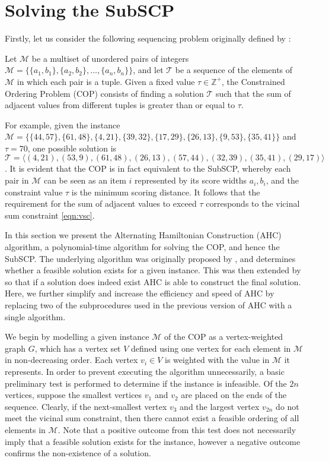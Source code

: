 \documentclass[authoryear]{elsarticle}
\begin{document}
\section{Solving the SubSCP}
\label{sec:ahc}
\noindent Firstly, let us consider the following sequencing problem originally defined by \citet{hawa2018}:

\begin{definition} %
	\label{defn:cop}
	Let $\mathcal{M}$ be a multiset of unordered pairs of integers $\mathcal{M} = \{\{a_1, b_1\}, \{a_2, b_2\},\dotsc,\{a_n, b_n\}\}$, and let $\mathcal{T}$ be a sequence of the elements of $\mathcal{M}$ in which each pair is a tuple. Given a fixed value $\tau \in \mathbb{Z}^+$, the Constrained Ordering Problem (COP) consists of finding a solution $\mathcal{T}$ such that the sum of adjacent values from different tuples is greater than or equal to $\tau$.
\end{definition}

\noindent For example, given the instance $\mathcal{M} = \{\{44,57\}, \{61,48\}, \{4,21\}, \{39,32\}, \{17,29\}, \{26,13\}, \{9,53\}, \{35,41\} \}$ and $\tau = 70$, one possible solution is $\mathcal{T} = \langle(4,21), (53,9), (61,48), (26,13), (57,44), (32,39), (35,41), (29,17)\rangle$. It is evident that the COP is in fact equivalent to the SubSCP, whereby each pair in $\mathcal{M}$ can be seen as an item $i$ represented by its score widths $a_i, b_i$, and the constraint value $\tau$ is the minimum scoring distance. It follows that the requirement for the sum of adjacent values to exceed $\tau$ corresponds to the vicinal sum constraint \eqref{eqn:vsc}.

In this section we present the Alternating Hamiltonian Construction (AHC) algorithm, a polynomial-time algorithm for solving the COP, and hence the SubSCP. The underlying algorithm was originally proposed by \citet{becker2010}, and determines whether a feasible solution exists for a given instance. This was then extended by \citet{hawa2018} so that if a solution does indeed exist AHC is able to construct the final solution. Here, we further simplify and increase the efficiency and speed of AHC by replacing two of the subprocedures used in the previous version of AHC with a single algorithm.

We begin by modelling a given instance $\mathcal{M}$ of the COP as a vertex-weighted graph $G$, which has a vertex set $V$ defined using one vertex for each element in $\mathcal{M}$ in non-decreasing order. Each vertex $v_i \in V$ is weighted with the value in $\mathcal{M}$ it represents. In order to prevent executing the algorithm unnecessarily, a basic preliminary test is performed to determine if the instance is infeasible. Of the $2n$ vertices, suppose the smallest vertices $v_1$ and $v_2$ are placed on the ends of the sequence. Clearly, if the next-smallest vertex $v_3$ and the largest vertex $v_{2n}$ do not meet the vicinal sum constraint, then there cannot exist a feasible ordering of all elements in $\mathcal{M}$. Note that a positive outcome from this test does not necessarily imply that a feasible solution exists for the instance, however a negative outcome confirms the non-existence of a solution.
\end{document}
